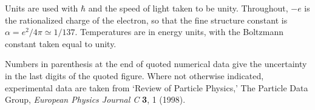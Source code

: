 Units are used with \(\hbar\) and the speed of light taken to be unity.
Throughout, \(-e\) is the rationalized charge of the electron, so that the
fine structure constant is \(\alpha=e^2/4\pi\simeq1/137\). Temperatures are in
energy units, with the Boltzmann constant taken equal to unity.

Numbers in parenthesis at the end of quoted numerical data give the
uncertainty in the last digits of the quoted figure. Where not otherwise
indicated, experimental data are taken from `Review of Particle Physics,' The
Particle Data Group, \emph{European Physics Journal C} \textbf{3}, 1 (1998).
